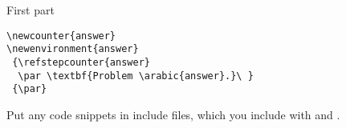 First part
\begin{verbatim}
\newcounter{answer}
\newenvironment{answer}
 {\refstepcounter{answer}
  \par \textbf{Problem \arabic{answer}.}\ }
 {\par}
\end{verbatim}
Put any code snippets in include files, which you include
with  and .
